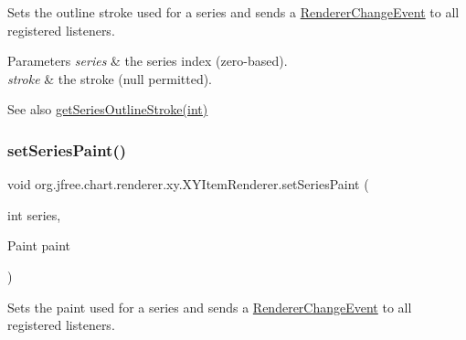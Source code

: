 Sets the outline stroke used for a series and sends a \mbox{\hyperlink{}{Renderer\+Change\+Event}} to all registered listeners.


\begin{DoxyParams}{Parameters}
{\em series} & the series index (zero-\/based). \\
\hline
{\em stroke} & the stroke ({\ttfamily null} permitted).\\
\hline
\end{DoxyParams}
\begin{DoxySeeAlso}{See also}
\mbox{\hyperlink{interfaceorg_1_1jfree_1_1chart_1_1renderer_1_1xy_1_1_x_y_item_renderer_a59b1beb337bddb75e4d43e5f26295244}{get\+Series\+Outline\+Stroke(int)}} 
\end{DoxySeeAlso}
\mbox{\label{interfaceorg_1_1jfree_1_1chart_1_1renderer_1_1xy_1_1_x_y_item_renderer_aeae40c1db9ca25301052d076e7d06b46}} 
\subsubsection{\texorpdfstring{set\+Series\+Paint()}{setSeriesPaint()}}
{\footnotesize\ttfamily void org.\+jfree.\+chart.\+renderer.\+xy.\+X\+Y\+Item\+Renderer.\+set\+Series\+Paint (\begin{DoxyParamCaption}\item[{int}]{series,  }\item[{Paint}]{paint }\end{DoxyParamCaption})}

Sets the paint used for a series and sends a \mbox{\hyperlink{}{Renderer\+Change\+Event}} to all registered listeners.


